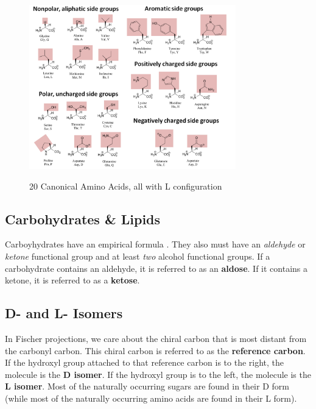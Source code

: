\documentclass{article}
\theoremstyle{plain}%
\theoremstyle{definition}
\theoremstyle{remark}
\begin{document}
\begin{figure}[h!]
\centering
\includegraphics[width=0.8\textwidth]{Amino_Acids.png} \label{Amino_Acids}
\caption{20 Canonical Amino Acids, all with L configuration}
\end{figure}

\subsection{Carbohydrates \& Lipids}
Carboyhydrates have an empirical formula . They also must have an \textit{aldehyde} or \textit{ketone} functional group and at least \textit{two} alcohol functional groups. If a carbohydrate contains an aldehyde, it is referred to as an \textbf{aldose}. If it contains a ketone, it is referred to as a \textbf{ketose}. 

\subsection{D- and L- Isomers}
In Fischer projections, we care about the chiral carbon that is most distant from the carbonyl carbon. This chiral carbon is referred to as the \textbf{reference carbon}. If the hydroxyl group attached to that reference carbon is to the right, the molecule is the \textbf{D isomer}. If the hydroxyl group is to the left, the molecule is the \textbf{L isomer}. Most of the naturally occurring sugars are found in their D form (while most of the naturally occurring amino acids are found in their L form).
\end{document}
